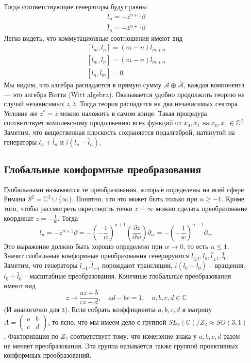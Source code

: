 \documentclass[a4paper,12pt]{article}
\theoremstyle{definition}
\theoremstyle{definition}
\theoremstyle{definition}
\begin{document}
Тогда соответствующие генераторы будут равны
\begin{eqnarray}
  \label{eq:229}
  l_{n}=-z^{n+1}\partial\\
  \bar l_{n}=-\bar z^{n+1}\bar \partial 
\end{eqnarray}
Легко видеть, что коммутационные соотношения имеют вид
\begin{eqnarray}
  \label{eq:230}
  \left[l_{m},l_{n}\right]=(m-n) l_{m+n}\\
  \left[\bar l_{m},\bar l_{n}\right]=(m-n) \bar l_{m+n}\\  
  \left[l_{n},\bar l_{m}\right]=0
\end{eqnarray}
Мы видим, что алгебра распадается в прямую сумму $\mathcal{A} \oplus \bar{\mathcal{A}}$, каждая компонента --- это алгебра Витта (Witt algebra). Оказывается удобно продолжить теорию на случай независимых $z,\bar z$. Тогда теория распадется на два независимых сектора. Условие же $z^{*}=\bar z$ можно наложить в самом конце. Такая процедура соответствует комплексному продолжению всех функций от $x_{0},x_{1}$ на $x_{0},x_{1}\in \mathbb{C}^{2}$. Заметим, что вещественная плоскость сохраняется подалгеброй, натянутой на генераторы $l_{n}+\bar l_{n}$ и $i(l_{n}-\bar l_{n})$.

\subsection{Глобальные конформные преобразования}
\label{sec:global-conformal}

Глобальными называются те преобразования, которые определены на всей сфере Римана $S^{2}=\mathbb{C}^{2}\cup \{\infty\}$. Понятно, что это может быть только при $n\geq -1$. Кроме того, чтобы рассмотреть окрестность точки $z=\infty$ можно сделать преобразование координат $z=-\frac{1}{w}$. Тогда
\begin{equation}
  \label{eq:231}
  l_{n}=-z^{n+1}\partial = - \left(-\frac{1}{w}\right)^{n+1}\left(\frac{\partial z}{\partial w}\right) \partial_{w}=-\left(-\frac{1}{w}\right)^{n-1}\partial_{w}.
\end{equation}
Это выражение должно быть хорошо определено при $w\to 0$, то есть $n\leq 1$. Значит глобальные конформные преобразования генерируются $l_{\pm 1},l_{0},\bar l_{\pm 1},\bar l_{0}$. Заметим, что генераторы $l_{-1},\bar l_{-1}$ порождают трансляции, $i(l_{0}-\bar l_{0})$ -- вращения, $l_{0}+\bar l_{0}$ -- масштабные преобразования. Конечные глобальные преобразования имеют вид
\begin{equation}
  \label{eq:232}
  z\to \frac{az+b}{cz+d}, \quad ad-bc=1,\quad a,b,c,d\in \mathbb{C}
\end{equation}
(И аналогично для $\bar z$).
Если собрать коэффициенты $a,b,c,d$ в матрицу $A=
\begin{pmatrix}
  a & b\\
  c & d
\end{pmatrix}$, то ясно, что мы имеем дело с группой $SL_{2}(\mathbb{C})/Z_{2}\approx SO(3,1)$. Факторизация по $Z_{2}$ соответствует тому, что изменение знака у $a,b,c,d$ разом не меняет преобразования. Эта группа называется также группой проективных конформных преобразований. 
\end{document}
